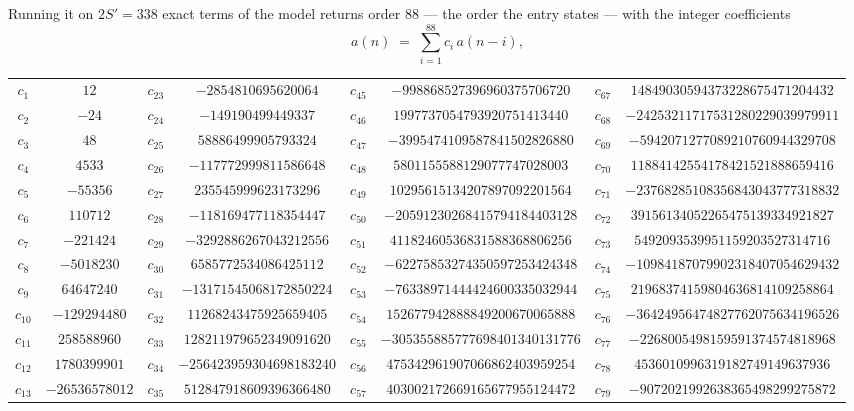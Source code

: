 \documentclass[11pt,a4paper]{article}
\theoremstyle{plain}
\theoremstyle{definition}
\begin{document}
Running it on $2S'=338$ exact terms of the model returns order $88$ --- the order the
entry states --- with the integer coefficients
\[
a(n)\;=\;\sum_{i=1}^{88}c_i\,a(n-i),
\]
\begin{center}\small
\begin{tabular}{cccccccc}
$c_{1}$ & $12$ & $c_{23}$ & $-2854810695620064$ & $c_{45}$ & $-998868527396960375706720$ & $c_{67}$ & $14849030594373228675471204432$ \\
$c_{2}$ & $-24$ & $c_{24}$ & $-149190499449337$ & $c_{46}$ & $1997737054793920751413440$ & $c_{68}$ & $-24253211717531280229039979911$ \\
$c_{3}$ & $48$ & $c_{25}$ & $58886499905793324$ & $c_{47}$ & $-3995474109587841502826880$ & $c_{69}$ & $-5942071277089210760944329708$ \\
$c_{4}$ & $4533$ & $c_{26}$ & $-117772999811586648$ & $c_{48}$ & $5801155588129077747028003$ & $c_{70}$ & $11884142554178421521888659416$ \\
$c_{5}$ & $-55356$ & $c_{27}$ & $235545999623173296$ & $c_{49}$ & $10295615134207897092201564$ & $c_{71}$ & $-23768285108356843043777318832$ \\
$c_{6}$ & $110712$ & $c_{28}$ & $-118169477118354447$ & $c_{50}$ & $-20591230268415794184403128$ & $c_{72}$ & $39156134052265475139334921827$ \\
$c_{7}$ & $-221424$ & $c_{29}$ & $-3292886267043212556$ & $c_{51}$ & $41182460536831588368806256$ & $c_{73}$ & $5492093539951159203527314716$ \\
$c_{8}$ & $-5018230$ & $c_{30}$ & $6585772534086425112$ & $c_{52}$ & $-62275853274350597253424348$ & $c_{74}$ & $-10984187079902318407054629432$ \\
$c_{9}$ & $64647240$ & $c_{31}$ & $-13171545068172850224$ & $c_{53}$ & $-76338971444424600335032944$ & $c_{75}$ & $21968374159804636814109258864$ \\
$c_{10}$ & $-129294480$ & $c_{32}$ & $11268243475925659405$ & $c_{54}$ & $152677942888849200670065888$ & $c_{76}$ & $-36424956474827762075634196526$ \\
$c_{11}$ & $258588960$ & $c_{33}$ & $128211979652349091620$ & $c_{55}$ & $-305355885777698401340131776$ & $c_{77}$ & $-2268005498159591374574818968$ \\
$c_{12}$ & $1780399901$ & $c_{34}$ & $-256423959304698183240$ & $c_{56}$ & $475342961907066862403959254$ & $c_{78}$ & $4536010996319182749149637936$ \\
$c_{13}$ & $-26536578012$ & $c_{35}$ & $512847918609396366480$ & $c_{57}$ & $403002172669165677955124472$ & $c_{79}$ & $-9072021992638365498299275872$ \\

\end{tabular}
\end{center}
\end{document}
